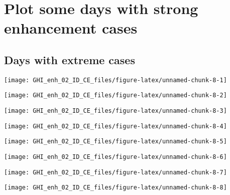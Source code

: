 \documentclass[
  10pt,
  a4paper,oneside]{article}
\begin{document}
\FloatBarrier

\hypertarget{plot-some-days-with-strong-enhancement-cases}{%
\section{Plot some days with strong enhancement cases}\label{plot-some-days-with-strong-enhancement-cases}}

\FloatBarrier

\hypertarget{days-with-extreme-cases}{%
\subsection{Days with extreme cases}\label{days-with-extreme-cases}}

\begin{center}\texttt{[image: GHI\_enh\_02\_ID\_CE\_files/figure-latex/unnamed-chunk-8-1]} \end{center}

\begin{center}\texttt{[image: GHI\_enh\_02\_ID\_CE\_files/figure-latex/unnamed-chunk-8-2]} \end{center}

\begin{center}\texttt{[image: GHI\_enh\_02\_ID\_CE\_files/figure-latex/unnamed-chunk-8-3]} \end{center}

\begin{center}\texttt{[image: GHI\_enh\_02\_ID\_CE\_files/figure-latex/unnamed-chunk-8-4]} \end{center}

\begin{center}\texttt{[image: GHI\_enh\_02\_ID\_CE\_files/figure-latex/unnamed-chunk-8-5]} \end{center}

\begin{center}\texttt{[image: GHI\_enh\_02\_ID\_CE\_files/figure-latex/unnamed-chunk-8-6]} \end{center}

\begin{center}\texttt{[image: GHI\_enh\_02\_ID\_CE\_files/figure-latex/unnamed-chunk-8-7]} \end{center}

\begin{center}\texttt{[image: GHI\_enh\_02\_ID\_CE\_files/figure-latex/unnamed-chunk-8-8]} \end{center}
\end{document}
